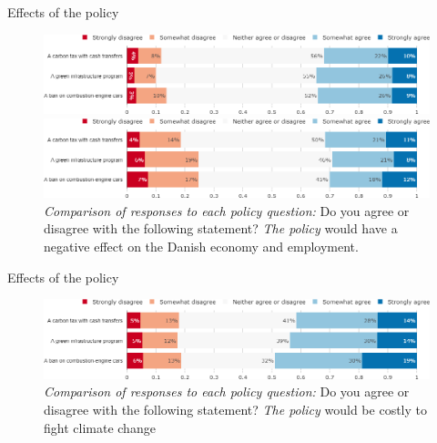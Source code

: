 \documentclass[aspectratio=169,9pt,dvipsnames]{beamer}
\begin{document}
\begin{frame}{Effects of the policy}%
\begin{figure}[h!]
\centering
\caption{\textit{Comparison of responses to each policy question:} Do you agree or disagree with the following statement? \textit{The policy} would have a large effect on the Danish economy and employment.}
\includegraphics[width=.9\textwidth]{../figures/DK/policies_large_effect_DK.png}
\vspace{-.1cm}
\centering
\caption{\textit{Comparison of responses to each policy question:} Do you agree or disagree with the following statement? \textit{The policy} would have a negative effect on the Danish economy and employment.}
\includegraphics[width=.9\textwidth]{../figures/DK/policies_negative_effect_DK.png}
\end{figure}
\end{frame}

\begin{frame}{Effects of the policy}%

\begin{figure}[h!]
\vspace{-.1cm}
\centering
\caption{\textit{Comparison of responses to each policy question:} Do you agree or disagree with the following statement? \textit{The policy} would be costly to fight climate change}
\includegraphics[width=\textwidth]{../figures/DK/policies_cost_effective_DK.png}
\end{figure}
\end{frame}
\end{document}
